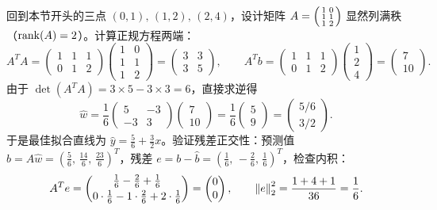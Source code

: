 \begin{example}[三点拟合直线的手算闭环]\label{ex:3pt-ls}
回到本节开头的三点 $(0,1),\, (1,2),\, (2,4)$，设计矩阵 $A = \begin{psmallmatrix} 1 & 0 \\ 1 & 1 \\ 1 & 2 \end{psmallmatrix}$ 显然列满秩（$\operatorname{rank}(A)=2$）。计算正规方程两端：
\[
A^T A = \begin{pmatrix} 1 & 1 & 1 \\ 0 & 1 & 2 \end{pmatrix}\begin{pmatrix} 1 & 0 \\ 1 & 1 \\ 1 & 2 \end{pmatrix}
= \begin{pmatrix} 3 & 3 \\ 3 & 5 \end{pmatrix}, \qquad
A^T b = \begin{pmatrix} 1 & 1 & 1 \\ 0 & 1 & 2 \end{pmatrix}\begin{pmatrix} 1 \\ 2 \\ 4 \end{pmatrix}
= \begin{pmatrix} 7 \\ 10 \end{pmatrix}.
\]
由于 $\det(A^T A) = 3\times 5 - 3\times 3 = 6$，直接求逆得
\[
\hat{w} = \frac{1}{6}\begin{pmatrix} 5 & -3 \\ -3 & 3 \end{pmatrix}\begin{pmatrix} 7 \\ 10 \end{pmatrix}
= \frac{1}{6}\begin{pmatrix} 5 \\ 9 \end{pmatrix}
= \begin{pmatrix} 5/6 \\ 3/2 \end{pmatrix}.
\]
于是最佳拟合直线为 $\hat{y} = \frac{5}{6} + \frac{3}{2} x$。验证残差正交性：预测值 $\hat{b} = A\hat{w} = (\frac{5}{6},\, \frac{14}{6},\, \frac{23}{6})^T$，残差 $e = b - \hat{b} = (\frac{1}{6},\, -\frac{2}{6},\, \frac{1}{6})^T$，检查内积：
\[
A^T e = \begin{pmatrix} \frac{1}{6} - \frac{2}{6} + \frac{1}{6} \\[2pt] 0\cdot\frac{1}{6} - 1\cdot\frac{2}{6} + 2\cdot\frac{1}{6} \end{pmatrix}
= \begin{pmatrix} 0 \\ 0 \end{pmatrix}, \qquad
\left\|e\right\|_2^2 = \frac{1 + 4 + 1}{36} = \frac{1}{6}.
\]
\end{example}

